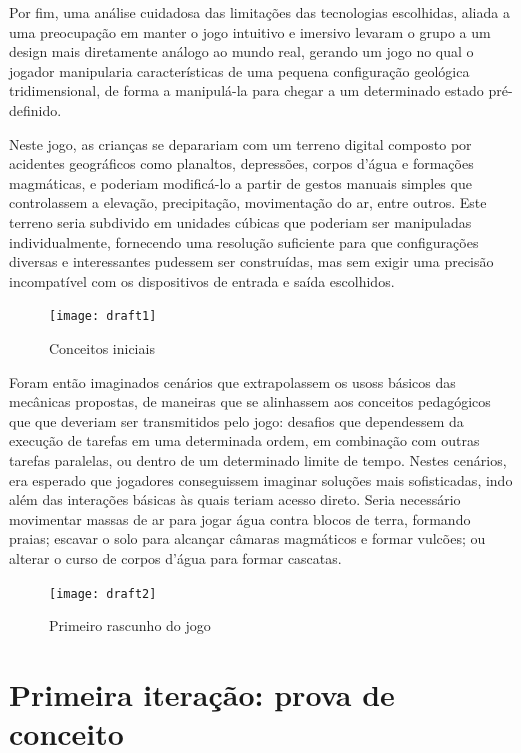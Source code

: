 Por fim, uma análise cuidadosa das limitações das tecnologias escolhidas, aliada a uma preocupação em manter o jogo intuitivo e imersivo levaram o grupo a um design mais diretamente análogo ao mundo real, gerando um jogo no qual o jogador manipularia características de uma pequena configuração geológica tridimensional, de forma a manipulá-la para chegar a um determinado estado pré-definido.

Neste jogo, as crianças se deparariam com um terreno digital composto por acidentes geográficos como planaltos, depressões, corpos d'água e formações magmáticas, e poderiam modificá-lo a partir de gestos manuais simples que controlassem a elevação, precipitação, movimentação do ar, entre outros. Este terreno seria subdivido em unidades cúbicas que poderiam ser manipuladas individualmente, fornecendo uma resolução suficiente para que configurações diversas e interessantes pudessem ser construídas, mas sem exigir uma precisão incompatível com os dispositivos de entrada e saída escolhidos.

\begin{figure}[h]
	\centering
	\texttt{[image: draft1]}
	\caption{Conceitos iniciais}
\end{figure}


Foram então imaginados cenários que extrapolassem os usoss básicos das mecânicas propostas, de maneiras que se alinhassem aos conceitos pedagógicos que que deveriam ser transmitidos pelo jogo: desafios que dependessem da execução de tarefas em uma determinada ordem, em combinação com outras tarefas paralelas, ou dentro de um determinado limite de tempo. Nestes cenários, era esperado que jogadores conseguissem imaginar soluções mais sofisticadas, indo além das interações básicas às quais teriam acesso direto. Seria necessário movimentar massas de ar para jogar água contra blocos de terra, formando praias; escavar o solo para alcançar câmaras magmáticos e formar vulcões; ou alterar o curso de corpos d'água para formar cascatas.

\begin{figure}[htb]
	\centering
	\texttt{[image: draft2]}
	\caption{Primeiro rascunho do jogo}
\end{figure}

\section{Primeira iteração: prova de conceito}\label{sec-primeira-iteracao-prova-conceito}

